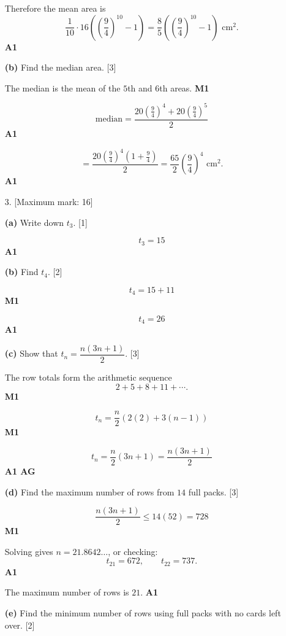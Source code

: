 \documentclass[12pt, twoside]{article}
\begin{document}
\begin{enumerate}[itemsep=0.35cm]
Therefore the mean area is
\[
\frac{1}{10}\cdot 16\left(\left(\frac{9}{4}\right)^{10}-1\right)
=\frac{8}{5}\left(\left(\frac{9}{4}\right)^{10}-1\right)\text{ cm}^2.
\]
\hfill \textbf{A1}

\medskip

\textbf{(b)} Find the median area. \hfill [3]

The median is the mean of the $5$th and $6$th areas. \hfill \textbf{M1}

\[
\text{median}
=\frac{20\left(\frac{9}{4}\right)^4+
20\left(\frac{9}{4}\right)^5}{2}
\]
\hfill \textbf{A1}

\[
=\frac{20\left(\frac{9}{4}\right)^4\left(1+\frac{9}{4}\right)}{2}
=\frac{65}{2}\left(\frac{9}{4}\right)^4\text{ cm}^2.
\]
\hfill \textbf{A1}

\newpage

\item[3.] [Maximum mark: 16]

\textbf{(a)} Write down $t_3$. \hfill [1]

\[
t_3=15
\]
\hfill \textbf{A1}

\medskip

\textbf{(b)} Find $t_4$. \hfill [2]

\[
t_4=15+11
\]
\hfill \textbf{M1}

\[
t_4=26
\]
\hfill \textbf{A1}

\medskip

\textbf{(c)} Show that $t_n=\dfrac{n(3n+1)}{2}$. \hfill [3]

The row totals form the arithmetic sequence
\[
2+5+8+11+\cdots .
\]
\hfill \textbf{M1}

\[
t_n=\frac{n}{2}\left(2(2)+3(n-1)\right)
\]
\hfill \textbf{M1}

\[
t_n=\frac{n}{2}(3n+1)=\frac{n(3n+1)}{2}
\]
\hfill \textbf{A1 AG}

\medskip

\textbf{(d)} Find the maximum number of rows from $14$ full packs.
\hfill [3]

\[
\frac{n(3n+1)}{2}\leq 14(52)=728
\]
\hfill \textbf{M1}

Solving gives $n=21.8642\ldots$, or checking:
\[
t_{21}=672,\qquad t_{22}=737.
\]
\hfill \textbf{A1}

The maximum number of rows is $21$. \hfill \textbf{A1}

\medskip

\textbf{(e)} Find the minimum number of rows using full packs with no
cards left over. \hfill [2]


\end{enumerate}
\end{document}
